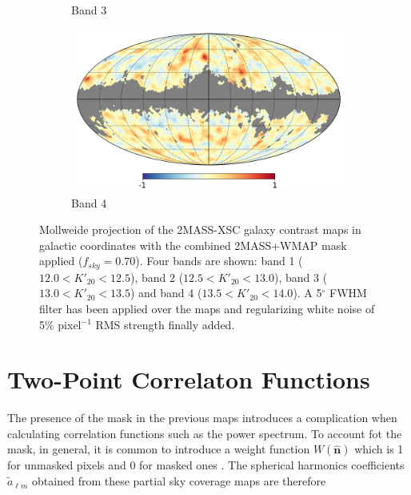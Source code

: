 \documentclass[openany,a4paper,12pt,oneside]{book}
\begin{document}
\begin{spacing}{1.5}
\begin{figure}[!htb]
\begin{subfigure}[b]{0.495\textwidth}
         \caption{Band 3}
         \label{fig:contrast_map3}
     \end{subfigure}
     \hfill
     \begin{subfigure}[b]{0.495\textwidth}
         \centering
         \includegraphics[width=\textwidth]{Imagens/band4_wmask_xsc.png}
         \caption{Band 4}
         \label{fig:contrast_map4}
     \end{subfigure}
     \caption{Mollweide projection of the 2MASS-XSC galaxy contrast maps in galactic coordinates with the combined 2MASS+WMAP mask applied ($f_{sky}=0.70$). Four bands are shown: band 1 ($12.0<K'_{20}<12.5$), band 2 ($12.5<K'_{20}<13.0$), band 3 ($13.0<K'_{20}<13.5$) and band 4 ($13.5<K'_{20}<14.0$). A 5$^{\circ}$ FWHM filter has been applied over the maps and regularizing white noise of 5\%  pixel$^{-1}$ RMS strength finally added.}
        \label{fig:2MASS_maps}
      \end{figure}

      
\section{Two-Point Correlaton Functions}


The presence of the mask in the previous maps introduces a complication when calculating correlation functions such as the power spectrum. To account fot the mask, in general, it is common to introduce a weight function $W(\hat{\mathbf{n}})$ which is 1 for unmasked pixels and 0 for masked ones \cite{Hivon_2002}. The spherical harmonics coefficients $\tilde{a}_{\ell m}$ obtained from these partial sky coverage maps are therefore


\end{spacing}
\end{document}
